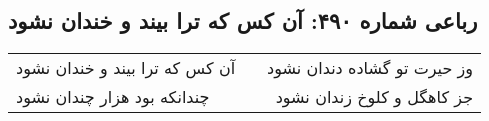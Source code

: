 \begin{center}
\section*{رباعی شماره ۴۹۰: آن کس که ترا بیند و خندان نشود}
\label{sec:0490}
\begin{longtable}{l p{0.5cm} r}
آن کس که ترا بیند و خندان نشود
&&
وز حیرت تو گشاده دندان نشود
\\
چندانکه بود هزار چندان نشود
&&
جز کاهگل و کلوخ زندان نشود
\\
\end{longtable}
\end{center}
